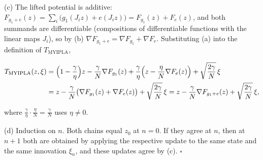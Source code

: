 \documentclass[11pt,a4paper]{article}
\begin{document}
(c) The lifted potential is additive: \(F_{g_1+e}(z)=\sum_i\bigl(g_1(J_iz)+e(J_iz)\bigr)=F_{g_1}(z)+F_e(z)\), and both summands are differentiable (compositions of differentiable functions with the linear maps \(J_i\)), so by (b) \(\nabla F_{g_1+e}=\nabla F_{g_1}+\nabla F_e\). Substituting (a) into the definition of \(T_{\mathrm{MYIPLA}}\),


\[\begin{aligned}
T_{\mathrm{MYIPLA}}(z,\xi)&=\Bigl(1-\frac\gamma\eta\Bigr)z-\frac\gamma N\nabla F_{g_1}(z)+\frac\gamma\eta\Bigl(z-\frac\eta N\nabla F_e(z)\Bigr)+\sqrt{\frac{2\gamma}N}\,\xi\\
&=z-\frac\gamma N\bigl(\nabla F_{g_1}(z)+\nabla F_e(z)\bigr)+\sqrt{\frac{2\gamma}N}\,\xi=z-\frac\gamma N\nabla F_{g_1+e}(z)+\sqrt{\frac{2\gamma}N}\,\xi,
\end{aligned}\]


where \(\frac\gamma\eta\cdot\frac\eta N=\frac\gamma N\) uses \(\eta\ne0\).




(d) Induction on \(n\). Both chains equal \(z_0\) at \(n=0\). If they agree at \(n\), then at \(n+1\) both are obtained by applying the respective update to the same state and the same innovation \(\xi_n\), and these updates agree by (c). \(\square\)
\end{document}
